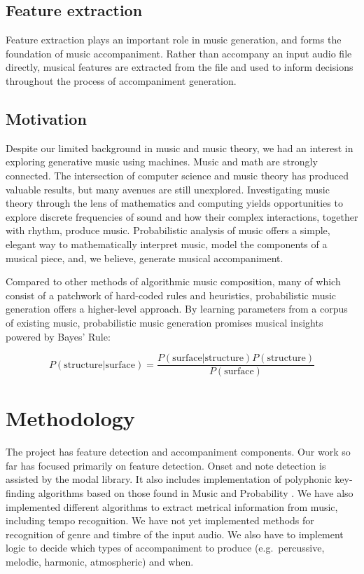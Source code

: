 \documentclass[11pt,conference,letterpaper]{IEEEtran}
\begin{document}

\subsection{Feature extraction}

Feature extraction plays an important role in music generation, and forms the foundation of music accompaniment. Rather than accompany an input audio file directly, musical features are extracted from the file and used to inform decisions throughout the process of accompaniment generation.

\subsection{Motivation}

Despite our limited background in music and music theory, we had an interest in exploring generative music using machines. Music and math are strongly connected. The intersection of computer science and music theory has produced valuable results, but many avenues are still unexplored. Investigating music theory through the lens of mathematics and computing yields opportunities to explore discrete frequencies of sound and how their complex interactions, together with rhythm, produce music. Probabilistic analysis of music offers a simple, elegant way to mathematically interpret music, model the components of a musical piece, and, we believe, generate musical accompaniment.

Compared to other methods of algorithmic music composition, many of which consist of a patchwork of hard-coded rules and heuristics, probabilistic music generation offers a higher-level approach. By learning parameters from a corpus of existing music, probabilistic music generation promises musical insights powered by Bayes' Rule:

{\small
  \[ P(\text{structure}|\text{surface}) = \frac{P(\text{surface}|\text{structure})P(\text{structure})}{P(\text{surface})} \]
}

\section{Methodology}

The project has feature detection and accompaniment components. Our work so far has focused primarily on feature detection. Onset and note detection is assisted by the modal library. It also includes implementation of polyphonic key-finding algorithms based on those found in Music and Probability \cite{temperly2007mprob}. We have also implemented different algorithms to extract metrical information from music, including tempo recognition. We have not yet implemented methods for recognition of genre and timbre of the input audio. We also have to implement logic to decide which types of accompaniment to produce (e.g.\ percussive, melodic, harmonic, atmospheric) and when.
\end{document}
